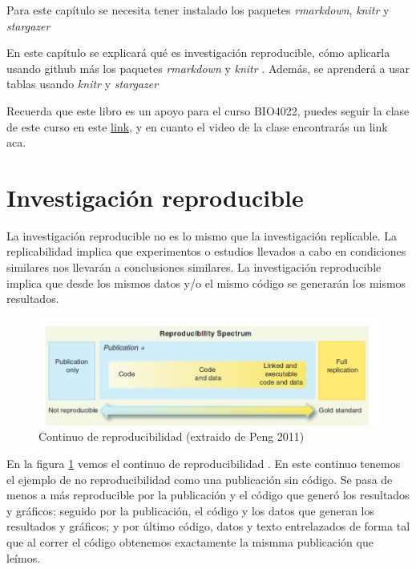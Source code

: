 \documentclass[]{book}
\begin{document}
Para este capítulo se necesita tener instalado los paquetes
\emph{rmarkdown}, \emph{knitr} y \emph{stargazer}

En este capítulo se explicará qué es investigación reproducible, cómo
aplicarla usando github más los paquetes \emph{rmarkdown}
\citep{Allaire2018} y \emph{knitr} \citep{xie2015}. Además, se aprenderá
a usar tablas usando \emph{knitr} \citep{xie2015} y \emph{stargazer}
\citep{hlavak2018}

Recuerda que este libro es un apoyo para el curso BIO4022, puedes seguir
la clase de este curso en este
\href{https://derek-corcoran-barrios.github.io/Clase2/Clase2InvestigacionReproducible}{link},
y en cuanto el video de la clase encontrarás un link aca.

\hypertarget{investigacion-reproducible}{%
\section{Investigación reproducible}\label{investigacion-reproducible}}

La investigación reproducible no es lo mismo que la investigación
replicable. La replicabilidad implica que experimentos o estudios
llevados a cabo en condiciones similares nos llevarán a conclusiones
similares. La investigación reproducible implica que desde los mismos
datos y/o el mismo código se generarán los mismos resultados.

\begin{figure}

{\centering \includegraphics[width=0.8\linewidth]{Reproducible} 

}

\caption{Continuo de reproducibilidad (extraido de Peng 2011)}\label{fig:reproducible}
\end{figure}

En la figura \ref{fig:reproducible} vemos el continuo de
reproducibilidad \citep{peng2011reproducible}. En este continuo tenemos
el ejemplo de no reproducibilidad como una publicación sin código. Se
pasa de menos a más reproducible por la publicación y el código que
generó los resultados y gráficos; seguido por la publicación, el código
y los datos que generan los resultados y gráficos; y por último código,
datos y texto entrelazados de forma tal que al correr el código
obtenemos exactamente la mismma publicación que leímos.
\end{document}
